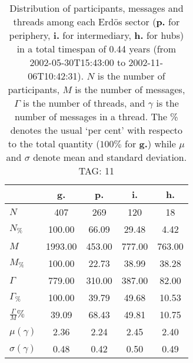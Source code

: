 \begin{table}[h!]
\begin{center}
\begin{tabular}{| l | c | c | c | c |}\hline
 & g. & p. & i. & h. \\\hline
$N$ & 407  & 269  & 120  & 18 \\\hline
$N_{\%}$ & 100.00  & 66.09  & 29.48  & 4.42 \\\hline
$M$ & 1993.00  & 453.00  & 777.00  & 763.00 \\\hline
$M_{\%}$ & 100.00  & 22.73  & 38.99  & 38.28 \\\hline
$\Gamma$ & 779.00  & 310.00  & 387.00  & 82.00 \\\hline
$\Gamma_{\%}$ & 100.00  & 39.79  & 49.68  & 10.53 \\\hline
$\frac{\Gamma}{M}\%$ & 39.09  & 68.43  & 49.81  & 10.75 \\\hline
$\mu(\gamma)$ & 2.36  & 2.24  & 2.45  & 2.40 \\\hline
$\sigma(\gamma)$ & 0.48  & 0.42  & 0.50  & 0.49 \\\hline
\end{tabular}
\caption{Distribution of participants, messages and threads among each Erd\"os sector ({\bf p.} for periphery, {\bf i.} for intermediary, 
    {\bf h.} for hubs) in a total timespan of 0.44 years (from 2002-05-30T15:43:00 to 2002-11-06T10:42:31). $N$ is the number of participants, $M$ is the number of messages, $\Gamma$ is the number of threads, and $\gamma$ is the number of messages in a thread.
    The \% denotes the usual `per cent' with respecto to the total quantity ($100\%$ for {\bf g.})
    while $\mu$ and $\sigma$ denote mean and standard deviation. TAG: 11}
\end{center}
\end{table}